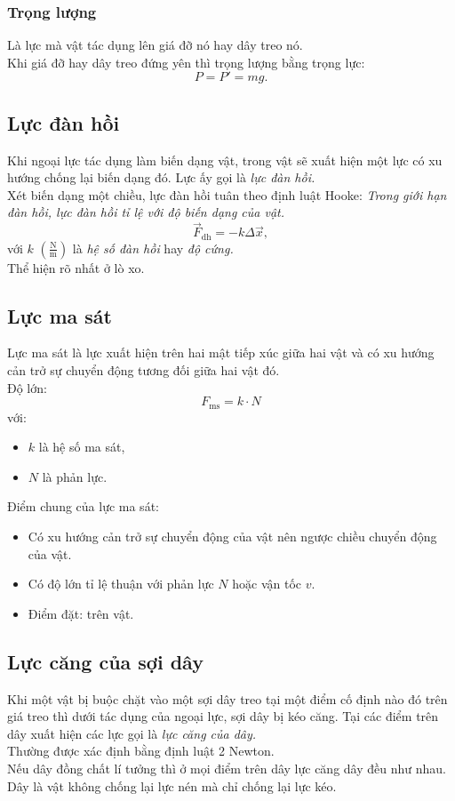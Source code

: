 \subsubsection{Trọng lượng}
Là lực mà vật tác dụng lên giá đỡ nó hay dây treo nó.\\
Khi giá đỡ hay dây treo đứng yên thì trọng lượng bằng trọng lực:
$$P = P' = mg.$$
\subsection{Lực đàn hồi}
Khi ngoại lực tác dụng làm biến dạng vật, trong vật sẽ xuất hiện một lực có xu hướng chống lại biến dạng đó. Lực ấy gọi là \textit{lực đàn hồi.}\\
Xét biến dạng một chiều, lực đàn hồi tuân theo định luật Hooke: \textit{Trong giới hạn đàn hồi, lực đàn hồi tỉ lệ với độ biến dạng của vật.}
$$\overrightarrow{F}_{\mathrm{dh}} = -k \Delta \overrightarrow{x},$$
với $k$ $\left( {\mathrm{\frac{N}{m}}} \right)$ là \textit{hệ số đàn hồi} hay \textit{độ cứng.}\\
Thể hiện rõ nhất ở lò xo.
\subsection{Lực ma sát}
Lực ma sát là lực xuất hiện trên hai mật tiếp xúc giữa hai vật và có xu hướng cản trở sự chuyển động tương đối giữa hai vật đó.\\
Độ lớn:
$$F_{\mathrm{ms}} = k \cdot N$$
với:
\begin{itemize}
\item $k$ là hệ số ma sát,
\item $N$ là phản lực.
\end{itemize}
Điểm chung của lực ma sát:
\begin{itemize}
\item Có xu hướng cản trở sự chuyển động của vật nên ngược chiều chuyển động của vật.
\item Có độ lớn tỉ lệ thuận với phản lực $N$ hoặc vận tốc $v.$
\item Điểm đặt: trên vật.
\end{itemize}
\subsection{Lực căng của sợi dây}
Khi một vật bị buộc chặt vào một sợi dây treo tại một điểm cố định nào đó trên giá treo thì dưới tác dụng của ngoại lực, sợi dây bị kéo căng. Tại các điểm trên dây xuất hiện các lực gọi là \textit{lực căng của dây.}\\
Thường được xác định bằng định luật 2 Newton.\\
Nếu dây đồng chất lí tưởng thì ở mọi điểm trên dây lực căng dây đều như nhau.\\
Dây là vật không chống lại lực nén mà chỉ chống lại lực kéo.